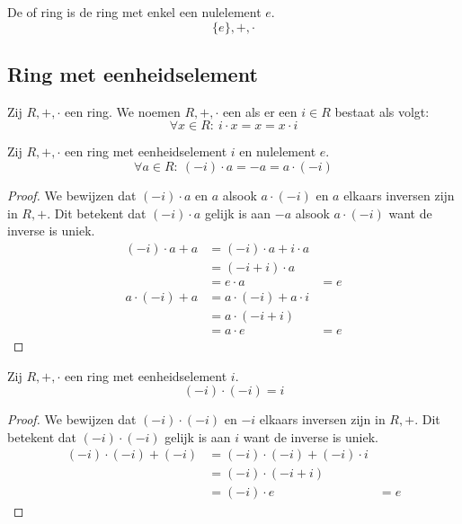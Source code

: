 \documentclass[main.tex]{subfiles}
\begin{document}
\begin{de}
  \label{de:nulring}
  De  of  ring is de ring met enkel een nulelement $e$.
  \[ \{ e \},+,\cdot \]
\end{de}

\subsection{Ring met eenheidselement}
\label{sec:ring-met-eenheidselement}

\begin{de}
  Zij $R,+,\cdot$ een ring.
  We noemen $R,+,\cdot$ een  als er een  $i\in R$ bestaat als volgt:
  \[ \forall x\in R:\ i\cdot x = x = x \cdot i \]
\end{de}

\begin{ei}
  \label{ei:rekenregels-eenheidselement}
  Zij $R,+,\cdot$ een ring met eenheidselement $i$ en nulelement $e$.
  \[ \forall a \in R:\ (-i)\cdot a = -a = a \cdot (-i) \]

  \begin{proof}
    We bewijzen dat $(-i) \cdot a$ en $a$ alsook $a \cdot (-i)$ en $a$ elkaars inversen zijn in $R,+$.
    Dit betekent dat $(-i) \cdot a$ gelijk is aan $-a$ alsook $a\cdot (-i)$ want de inverse is uniek.
    \[
    \begin{array}{rll}
      (-i) \cdot a + a &= (-i) \cdot a + i \cdot a &\\
                       &= (-i + i) \cdot a &\\
                       &= e \cdot a &= e
    \end{array}
    \]
    \[
    \begin{array}{rll}
      a \cdot (-i) + a &= a \cdot (-i) + a \cdot i &\\
                       &= a \cdot (-i+i) &\\
                       &= a \cdot e &= e
    \end{array}
    \]
  \end{proof}
\end{ei}

\begin{ei}
  Zij $R,+,\cdot$ een ring met eenheidselement $i$.
  \[ (-i) \cdot (-i) = i\]
  \begin{proof}
    We bewijzen dat $(-i) \cdot (-i)$ en $-i$ elkaars inversen zijn in $R,+$.
    Dit betekent dat $(-i) \cdot (-i)$ gelijk is aan $i$ want de inverse is uniek.
    \[
    \begin{array}{rll}
      (-i) \cdot (-i) + (-i) &= (-i) \cdot (-i) + (-i) \cdot i &\\
                             &= (-i) \cdot (-i + i) &\\
                             &= (-i) \cdot e &= e
    \end{array}
    \]
  \end{proof}
\end{ei}
\end{document}
